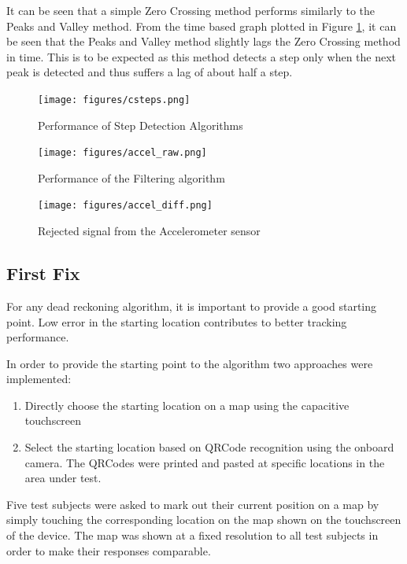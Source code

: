 It can be seen that a simple Zero Crossing method performs similarly to the 
Peaks and Valley method. From the time based graph plotted in 
Figure \ref{fig:csteps}, it can be seen that the Peaks and Valley method 
slightly lags the Zero Crossing method in time. This is to be expected as this
method detects a step only when the next peak is detected and thus suffers a 
lag of about half a step.

\begin{figure}[tbph]
    \centering
    \texttt{[image: figures/csteps.png]}
    \caption{Performance of Step Detection Algorithms\label{fig:csteps}}
\end{figure}

\begin{figure}[tbph]
    \centering
    \texttt{[image: figures/accel\_raw.png]}
    \caption{Performance of the Filtering algorithm \label{fig:accel_raw}}
\end{figure}

\begin{figure}[tbph]
    \centering
    \texttt{[image: figures/accel\_diff.png]}
    \caption{Rejected signal from the Accelerometer sensor \label{fig:accel_diff}}
\end{figure}


\subsection{First Fix}

For any dead reckoning algorithm, it is important to provide a good starting
point. Low error in the starting location contributes to better
tracking performance.

In order to provide the starting point to the algorithm two approaches were
implemented:

\begin{enumerate}
\item Directly choose the starting location on a map using the capacitive 
    touchscreen
\item Select the starting location based on QRCode recognition using the onboard
    camera. The QRCodes were printed and pasted at specific locations 
    in the area under test.
\end{enumerate}

Five test subjects were asked to mark out their current position on a
map by simply touching the corresponding location on the map shown on the 
touchscreen of the device. The map was shown at a fixed resolution to all 
test subjects in order to make their responses comparable. 

